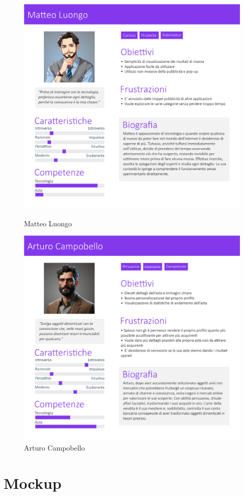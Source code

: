         \begin{figure}[!htb]
           \begin{minipage}{0.48\textwidth}
                \centering
             \includegraphics[width=.7\linewidth]{Immagini/Personas/Matteo Luongo.pdf}
             \caption{Matteo Luongo}\label{Fig:Matteo Luongo}
           \end{minipage}\hfill
           \begin{minipage}{0.48\textwidth}
                \centering
             \includegraphics[width=.7\linewidth]{Immagini/Personas/Arturo Campobello.pdf}
             \caption{Arturo Campobello}\label{Fig:Arturo Campobello}
           \end{minipage}
        \end{figure}
        
    \section{Mockup}

